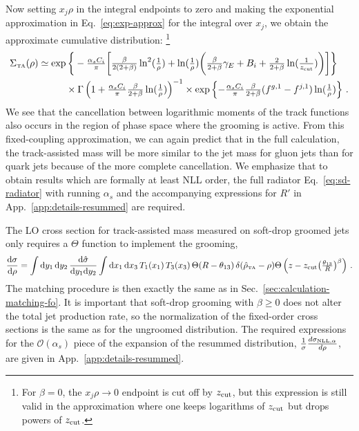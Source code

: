 \documentclass[letterpaper,11pt]{article}
\newcommand{\Sec}[1]{Sec.~\ref{#1}}
\newcommand{\App}[1]{App.~\ref{#1}}
\newcommand{\Eq}[1]{Eq.~\eqref{#1}}
\begin{document}
Now setting $x_j\rho$ in the integral endpoints to zero and making the exponential approximation in \Eq{eq:exp-approx} for the integral over $x_j$, we obtain the approximate cumulative distribution:%
%
\footnote{For $\beta = 0$, the $x_j\rho \to 0$ endpoint is cut off by $z_{\rm cut}$, but this expression is still valid in the approximation where one keeps logarithms of $z_{\rm cut}$ but drops powers of  $z_{\rm cut}$.}
%
\begin{align}
\label{eq:sd-cumulative-fixed-coupling}
\begin{split}
\Sigma_{\mbox{\tiny TA}}(\rho) &\simeq \exp\bigg\{-\tfrac{\alpha_s C_i}{\pi}\bigg[\tfrac{\beta}{2(2+\beta)}\ln^2(\tfrac{1}{\rho}) + \ln(\tfrac{1}{\rho}) \bigg(\tfrac{\beta}{2+\beta} \gamma_E + B_i +\tfrac{2}{2+\beta}\ln(\tfrac{1}{z_{\rm cut}})   \bigg) \bigg] \bigg\}\\
&\hspace{1cm} \times \Gamma\left(1+ \tfrac{\alpha_sC_i}{\pi}\tfrac{\beta}{2+\beta} \ln(\tfrac{1}{\rho})\right)^{-1} \times \exp\left\{-\tfrac{\alpha_sC_i}{\pi}\tfrac{\beta}{2+\beta} (f^{g,1}-f^{j,1})\ln(\tfrac{1}{\rho}) \right\}\,.
\end{split}
\end{align}
%
We see that the cancellation between logarithmic moments of the track functions also occurs in the region of phase space where the grooming is active. 
%
From this fixed-coupling approximation, we can again predict that in the full calculation, the track-assisted mass will be more similar to the jet mass for gluon jets than for quark jets because of the more complete cancellation. 
%
We emphasize that to obtain results which are formally at least NLL order, the full radiator \Eq{eq:sd-radiator} with running $\alpha_s$ and the accompanying expressions for $R'$ in \App{app:details-resummed} are required. 

The LO cross section for track-assisted mass measured on soft-drop groomed jets only requires a $\Theta$ function to implement the grooming,
\begin{equation}
\label{eq:fixed-order-cross-section-sd}
\frac{\text{d}\sigma}{\text{d}\rho} = \int \text{d}y_1\, \text{d}y_2\, \frac{\text{d}\hat{\sigma}}{\text{d}y_1\text{d}y_2} \int \text{d}x_1\, \text{d}x_3\, T_1(x_1)\,T_3(x_3)\,  \Theta(R-\theta_{13})\, \delta (\hat{\rho}_{\mbox{\tiny TA}}-\rho) \Theta \left(z -z_{\rm cut} \big(\tfrac{\theta_{13}}{R} \big)^\beta \right)\,.
\end{equation}
The matching procedure is then exactly the same as in \Sec{sec:calculation-matching-fo}. 
%
It is important that soft-drop grooming with $\beta\ge 0$ does not alter the total jet production rate, so the normalization of the fixed-order cross sections is the same as for the ungroomed distribution. 
%
The required expressions for the $\mathcal{O}(\alpha_s)$ piece of the expansion of the resummed distribution, $\tfrac{1}{\sigma}\tfrac{d\sigma_{\mbox{\tiny NLL,}\alpha}}{d\rho}$, are given in \App{app:details-resummed}. 
\end{document}
